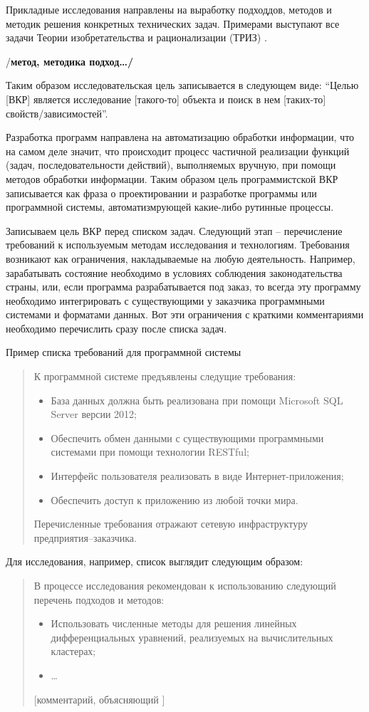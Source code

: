 \documentclass[a4paper,14pt,final]{extreport}
\newcommand{\todo}[1]{{/\bfseries #1\ldots/}}
\begin{document}
Прикладные исследования направлены на выработку подходдов, методов и методик решения конкретных технических задач.  Примерами выступают все задачи Теории изобретательства и рационализации (ТРИЗ) \cite{altov}.

\todo{метод, методика подход}

Таким образом исследовательская цель записывается в следующем виде: ``Целью [ВКР] является исследование [такого-то] объекта и поиск в нем [таких-то] свойств/зависимостей''.

Разработка программ направлена на автоматизацию обработки информации, что на самом деле значит, что происходит процесс частичной реализации функций (задач, последовательности действий), выполняемых вручную, при помощи методов обработки информации.  Таким образом цель программистской ВКР записывается как фраза о проектировании и разработке программы или программной системы, автоматизмрующей какие-либо рутинные процессы.

Записываем цель ВКР перед списком задач.  Следующий этап -- перечисление требований к используемым методам исследования и технологиям.  Требования возникают как ограничения, накладываемые на любую деятельность.  Например, зарабатывать состояние необходимо в условиях соблюдения законодательства страны, или, если программа разрабатывается под заказ, то всегда эту программу необходимо интегрировать с существующими у заказчика программными системами и форматами данных.  Вот эти ограничения с краткими комментариями необходимо перечислить сразу после списка задач.

Пример списка требований для программной системы
\begin{quote}
  К программной системе предъявлены следущие требования:
  \begin{itemize}
  \item База данных должна быть реализована при помощи Microsoft SQL Server версии 2012;
  \item Обеспечить обмен данными с существующими программными системами при помощи технологии RESTful;
  \item Интерфейс пользователя реализовать в виде Интернет-приложения;
  \item Обеспечить доступ к приложению из любой точки мира.
  \end{itemize}
   Перечисленные требования отражают сетевую инфраструктуру предприятия--заказчика.
\end{quote}

Для исследования, например, список выглядит следующим образом:
\begin{quote}
  В процессе исследования рекомендован к использованию следующий перечень подходов и методов:
  \begin{itemize}
  \item Использовать численные методы для решения линейных дифференциальных уравнений, реализуемых на вычислительных кластерах;
  \item \ldots{}
  \end{itemize}
[комментарий, объясняющий ]
\end{quote}
\end{document}
